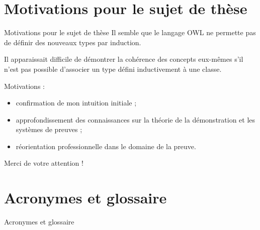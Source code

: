 \documentclass[
  hyperref={
    pdfusetitle,
    pdfencoding=auto,
    psdextra,
    colorlinks=true,
    linkcolor=darkblue,
    citecolor=darkred,
    urlcolor=darkblue,
  },
  9pt,
  aspectratio=169,
]{beamer}
\begin{document}
\section{Motivations pour le sujet de thèse}

\begin{frame}{Motivations pour le sujet de thèse}
  Il semble que le langage \gls{OWL} ne permette pas
  de définir des nouveaux types par induction.

  Il apparaissait difficile de démontrer la cohérence des concepts eux-mêmes
  s'il n'est pas possible
  d'associer un type défini inductivement à une classe.

  Motivations :
  \begin{itemize}
    \item
      confirmation de mon intuition initiale ;
    \item
      approfondissement des connaissances
      sur la théorie de la démonstration et les systèmes de preuves ;
    \item
      réorientation professionnelle dans le domaine de la preuve.
  \end{itemize}

\end{frame}

\begin{frame}[standout]
  Merci de votre attention !
\end{frame}


\section*{Acronymes et glossaire}
\begin{frame}[allowframebreaks]{Acronymes et glossaire}
  \printglossary[style=listgroup, type=\acronymtype]
  \printglossary[style=listgroup, type=main]
\end{frame}

\end{document}
